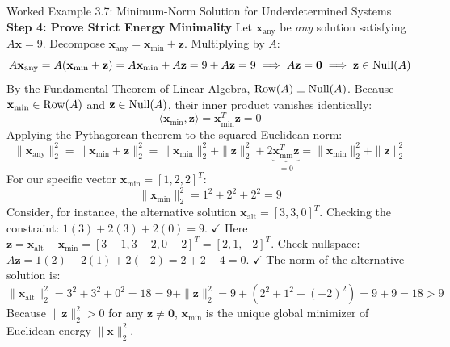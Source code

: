 \begin{examplebox}{Worked Example 3.7: Minimum-Norm Solution for Underdetermined Systems}
\textbf{Step 4: Prove Strict Energy Minimality}
Let $\mathbf{x}_{\mathrm{any}}$ be \emph{any} solution satisfying $A\mathbf{x} = 9$.
Decompose $\mathbf{x}_{\mathrm{any}} = \mathbf{x}_{\mathrm{min}} + \mathbf{z}$.
Multiplying by $A$:
\begin{equation*}
A\mathbf{x}_{\mathrm{any}} = A(\mathbf{x}_{\mathrm{min}} + \mathbf{z}) = A\mathbf{x}_{\mathrm{min}} + A\mathbf{z} = 9 + A\mathbf{z} = 9 \implies A\mathbf{z} = \mathbf{0} \implies \mathbf{z} \in \operatorname{Null}(A)
\end{equation*}
By the Fundamental Theorem of Linear Algebra, $\operatorname{Row}(A) \perp \operatorname{Null}(A)$.
Because $\mathbf{x}_{\mathrm{min}} \in \operatorname{Row}(A)$ and $\mathbf{z} \in \operatorname{Null}(A)$, their inner product vanishes identically:
\begin{equation*}
\langle \mathbf{x}_{\mathrm{min}}, \mathbf{z} \rangle = \mathbf{x}_{\mathrm{min}}^T \mathbf{z} = 0
\end{equation*}
Applying the Pythagorean theorem to the squared Euclidean norm:
\begin{equation*}
\|\mathbf{x}_{\mathrm{any}}\|_2^2 = \|\mathbf{x}_{\mathrm{min}} + \mathbf{z}\|_2^2 = \|\mathbf{x}_{\mathrm{min}}\|_2^2 + \|\mathbf{z}\|_2^2 + 2 \underbrace{\mathbf{x}_{\mathrm{min}}^T \mathbf{z}}_{= 0} = \|\mathbf{x}_{\mathrm{min}}\|_2^2 + \|\mathbf{z}\|_2^2
\end{equation*}
For our specific vector $\mathbf{x}_{\mathrm{min}} = [1, 2, 2]^T$:
\begin{equation*}
\|\mathbf{x}_{\mathrm{min}}\|_2^2 = 1^2 + 2^2 + 2^2 = 9
\end{equation*}
Consider, for instance, the alternative solution $\mathbf{x}_{\mathrm{alt}} = [3, 3, 0]^T$.
Checking the constraint: $1(3) + 2(3) + 2(0) = 9$. $\checkmark$
Here $\mathbf{z} = \mathbf{x}_{\mathrm{alt}} - \mathbf{x}_{\mathrm{min}} = [3 - 1, 3 - 2, 0 - 2]^T = [2, 1, -2]^T$.
Check nullspace: $A\mathbf{z} = 1(2) + 2(1) + 2(-2) = 2 + 2 - 4 = 0$. $\checkmark$
The norm of the alternative solution is:
\begin{equation*}
\|\mathbf{x}_{\mathrm{alt}}\|_2^2 = 3^2 + 3^2 + 0^2 = 18 = 9 + \|\mathbf{z}\|_2^2 = 9 + (2^2 + 1^2 + (-2)^2) = 9 + 9 = 18 > 9
\end{equation*}
Because $\|\mathbf{z}\|_2^2 > 0$ for any $\mathbf{z} \ne \mathbf{0}$, $\mathbf{x}_{\mathrm{min}}$ is the unique global minimizer of Euclidean energy $\|\mathbf{x}\|_2^2$.
\end{examplebox}

